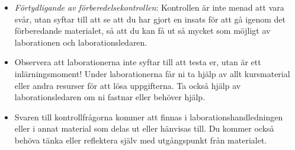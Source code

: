 \documentclass[fleqn, article, a4paper]{memoir}
\begin{document}
\begin{itemize}
	\item \emph{Förtydligande av förberedelsekontrollen}: Kontrollen är inte menad att vara svår, utan syftar till att se att du har gjort en insats för att gå igenom det förberedande materialet, så att du kan få ut så mycket som möjligt av laborationen och laborationsledaren.

	\item Observera att laborationerna inte syftar till att testa er, utan är ett inlärningsmoment! Under laborationerna får ni ta hjälp av allt kursmaterial eller andra resurser för att lösa uppgifterna. Ta också hjälp av laborationsledaren om ni fastnar eller behöver hjälp.

	\item Svaren till kontrollfrågorna kommer att finnas i laborationshandledningen eller i annat material som delas ut eller hänvisas till. Du kommer också behöva tänka eller reflektera själv med utgångspunkt från materialet.
\end{itemize}

\end{document}

